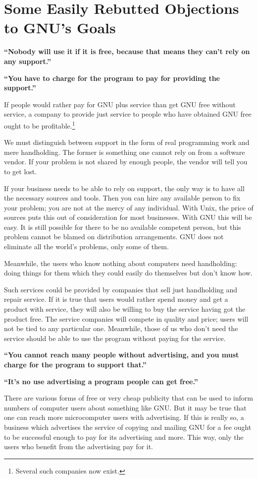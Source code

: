 \section{Some Easily Rebutted Objections to GNU's Goals}
\textbf{“Nobody will use it if it is free, because that means they can't rely on any support.”}\par
\textbf{“You have to charge for the program to pay for providing the support.”}\par
If people would rather pay for GNU plus service than get GNU free without service, a company to provide just service to people who have obtained GNU free ought to be profitable.\footnote{Several such companies now exist.}\par
We must distinguish between support in the form of real programming work and mere handholding. The former is something one cannot rely on from a software vendor. If your problem is not shared by enough people, the vendor will tell you to get lost.\par
If your business needs to be able to rely on support, the only way is to have all the necessary sources and tools. Then you can hire any available person to fix your problem; you are not at the mercy of any individual. With Unix, the price of sources puts this out of consideration for most businesses. With GNU this will be easy. It is still possible for there to be no available competent person, but this problem cannot be blamed on distribution arrangements. GNU does not eliminate all the world's problems, only some of them.\par
Meanwhile, the users who know nothing about computers need handholding: doing things for them which they could easily do themselves but don't know how.\par
Such services could be provided by companies that sell just handholding and repair service. If it is true that users would rather spend money and get a product with service, they will also be willing to buy the service having got the product free. The service companies will compete in quality and price; users will not be tied to any particular one. Meanwhile, those of us who don't need the service should be able to use the program without paying for the service.\par
\textbf{“You cannot reach many people without advertising, and you must charge for the program to support that.”}\par
\textbf{“It's no use advertising a program people can get free.”}\par
There are various forms of free or very cheap publicity that can be used to inform numbers of computer users about something like GNU. But it may be true that one can reach more microcomputer users with advertising. If this is really so, a business which advertises the service of copying and mailing GNU for a fee ought to be successful enough to pay for its advertising and more. This way, only the users who benefit from the advertising pay for it.\par
